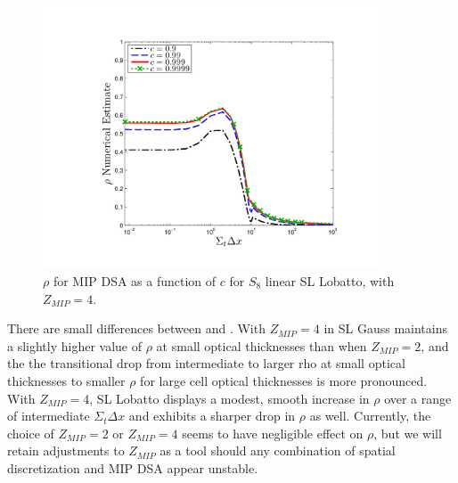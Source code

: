 \begin{figure}[!hbp]
\centering
\includegraphics[width=10cm]{chapter4_acceleration/Const_4_Constant_XS_c_comparions_MIP_Lobatto.pdf}
\caption{$\rho$ for MIP DSA as a function of $c$  for  $S_8$  linear SL Lobatto, with $Z_{MIP}=4$.}
\label{fig:mip_lobatto_as_fun_c_z4}
\end{figure}

There are small differences between  and  .  With $Z_{MIP}=4$ in  SL Gauss maintains a slightly higher value of $\rho$ at small optical thicknesses than when $Z_{MIP}=2$, and the the transitional drop from intermediate to larger rho at small optical thicknesses to smaller $\rho$ for large cell optical thicknesses is more pronounced.
With $Z_{MIP}=4$, SL Lobatto displays a modest, smooth increase in $\rho$ over  a range of intermediate $\Sigma_t \Delta x$ and exhibits a sharper drop in $\rho$ as well.
Currently, the choice of $Z_{MIP}=2$ or $Z_{MIP}=4$ seems to have negligible effect on $\rho$, but we will retain adjustments to $Z_{MIP}$ as a tool should any combination of spatial discretization and MIP DSA appear unstable.

